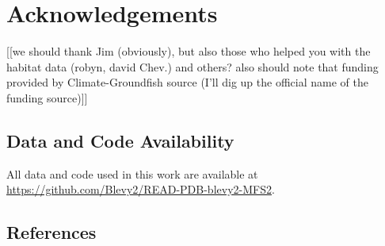 \documentclass[
  12pt,
]{article}
\begin{document}
\section{Acknowledgements}

{[}{[}we should thank Jim (obviously), but also those who helped you with the habitat data (robyn, david Chev.) and others? also should note that funding provided by Climate-Groundfish source (I'll dig up the official name of the funding source){]}{]}

\hypertarget{data-and-code-availability}{%
\subsection{Data and Code Availability}\label{data-and-code-availability}}

All data and code used in this work are available at \url{https://github.com/Blevy2/READ-PDB-blevy2-MFS2}.

\hypertarget{references}{%
\subsection{References}\label{references}}
\end{document}
